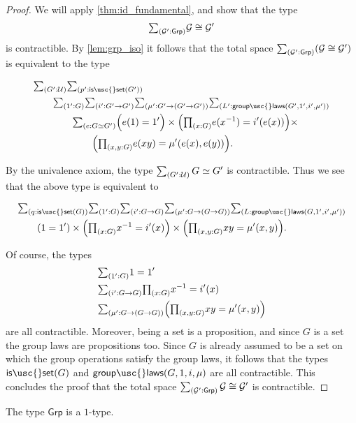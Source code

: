 \begin{proof}
We will apply \cref{thm:id_fundamental}, and show that the type
\begin{equation*}
\sm{\mathcal{G}':\mathsf{Grp}}\mathcal{G}\cong\mathcal{G}'
\end{equation*}
is contractible.
By \cref{lem:grp_iso} it follows that the total space $\sm{\mathcal{G}':\mathsf{Grp}}(\mathcal{G}\cong\mathcal{G}')$ is equivalent to the type
\begin{samepage}
\begin{align*}
& \sm{G':\UU}{p':\mathsf{is\usc{}set}(G')} \\
& \qquad \sm{1':G}{i':G'\to G'}{\mu':G'\to (G'\to G')}{L':\mathsf{group\usc{}laws}(G',1',i',\mu')} \\
& \qquad \qquad \sm{e:\eqv{G}{G'}} \Big(e(1)=1'\Big) \times \Big(\prd{x:G}e(x^{-1})= i'(e(x))\Big)\times\\
& \qquad \qquad \qquad\Big(\prd{x,y:G}e(xy)=\mu'(e(x),e(y))\Big).
\end{align*}
\end{samepage}%
By the univalence axiom, the type $\sm{G':\UU}\eqv{G}{G'}$ is contractible. Thus we see that the above type is equivalent to
\begin{samepage}
\begin{align*}
& \sm{q:\mathsf{is\usc{}set}(G)}{1':G}{i':G\to G}{\mu':G\to (G\to G)}{L:\mathsf{group\usc{}laws}(G,1',i',\mu')} \\
& \qquad (1=1') \times \Big(\prd{x:G}x^{-1}= i'(x)\Big)\times\Big(\prd{x,y:G}xy=\mu'(x,y)\Big).
\end{align*}
\end{samepage}
Of course, the types
\begin{align*}
& \sm{1':G} 1=1' \\
& \sm{i':G\to G}\prd{x:G}x^{-1}=i'(x) \\
& \sm{\mu':G\to (G\to G)}\Big(\prd{x,y:G}xy=\mu'(x,y)\Big)
\end{align*}
are all contractible. Moreover, being a set is a proposition, and since $G$ is a set the group laws are propositions too. Since $G$ is already assumed to be a set on which the group operations satisfy the group laws, it follows that the types $\mathsf{is\usc{}set}(G)$ and $\mathsf{group\usc{}laws}(G,1,i,\mu)$ are all contractible. This concludes the proof that the total space $\sm{\mathcal{G}':\mathsf{Grp}}\mathcal{G}\cong\mathcal{G}'$ is contractible. 
\end{proof}

\begin{cor}
The type $\mathsf{Grp}$ is a $1$-type.
\end{cor}

